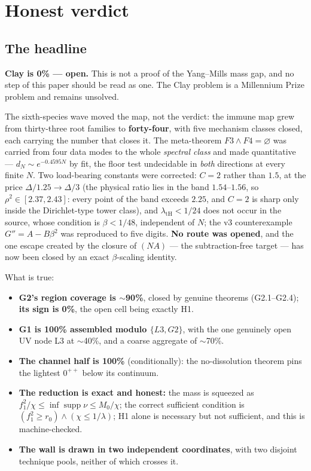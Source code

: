 \section{Honest verdict}

\figverdictcard
\label{sec:verdict}

\subsection{The headline}

\textbf{Clay is 0\% --- open.} This is not a proof of the Yang--Mills mass gap, and no step of
this paper should be read as one. The Clay problem is a Millennium Prize problem and remains
unsolved.

The sixth-species wave moved the map, not the verdict: the immune map grew from thirty-three root
families to \textbf{forty-four}, with five mechanism classes closed, each carrying the number that closes
it. The meta-theorem $F3\wedge F4=\varnothing$ was carried from four data modes to the whole
\emph{spectral class} and made quantitative --- $d_N\sim e^{-0.4595N}$ by fit, the floor test
undecidable in \emph{both} directions at every finite $N$. Two load-bearing constants were corrected:
$C=2$ rather than $1.5$, at the price $\Delta/1.25\to\Delta/3$ (the physical ratio lies in the band
$1.54$--$1.56$, so $\rho^2\in[2.37,2.43]$: every point of the band exceeds $2.25$, and $C=2$ is sharp
only inside the Dirichlet-type tower class), and $\lambda_{\mathrm{tH}}<1/24$ does not occur in the
source, whose condition is $\beta<1/48$, independent of $N$; the v3 counterexample $G''=A-B\beta^2$ was
reproduced to five digits. \textbf{No route was opened}, and the one escape created by the closure of
$(NA)$ --- the subtraction-free target --- has now been closed by an exact $\beta$-scaling identity.

What is true:

\begin{itemize}
\item \textbf{G2's region coverage is $\sim$90\%}, closed by genuine theorems (G2.1--G2.4);
  \textbf{its sign is 0\%}, the open cell being exactly H1.
\item \textbf{G1 is 100\% assembled modulo $\{L3,G2\}$}, with the one genuinely open UV node L3 at
  $\sim$40\%, and a coarse aggregate of $\sim$70\%.
\item \textbf{The channel half is 100\%} (conditionally): the no-dissolution theorem pins the
  lightest $0^{++}$ below its continuum.
\item \textbf{The reduction is exact and honest:} the mass is squeezed as
  $f_1^2/\chi\le\inf\operatorname{supp}\nu\le M_0/\chi$; the correct sufficient condition is
  $(f_1^2\ge r_0)\wedge(\chi\le1/\lambda)$; H1 alone is necessary but not sufficient, and this is
  machine-checked.
\item \textbf{The wall is drawn in two independent coordinates}, with two disjoint technique
  pools, neither of which crosses it.
\end{itemize}

